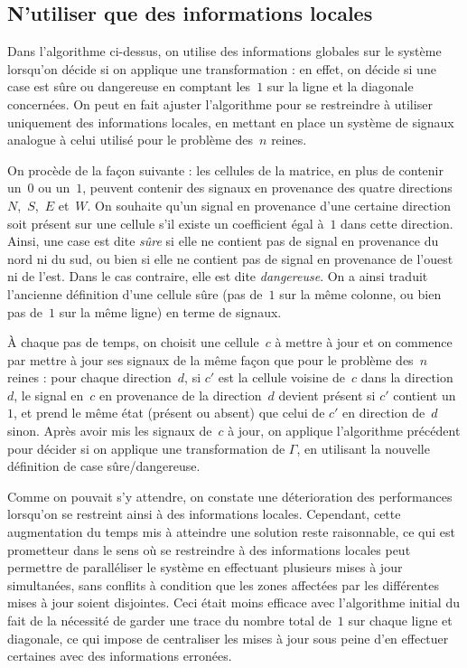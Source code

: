 \documentclass[11pt, openany, a4paper]{article}
\begin{document}
\subsection{N'utiliser que des informations locales}

Dans l'algorithme ci-dessus, on utilise des informations globales sur le système lorsqu'on décide si on applique une transformation : en effet, on décide si une case est sûre ou dangereuse en comptant les~$1$ sur la ligne et la diagonale concernées. On peut en fait ajuster l'algorithme pour se restreindre à utiliser uniquement des informations locales, en mettant en place un système de signaux analogue à celui utilisé pour le problème des~$n$ reines. 

On procède de la façon suivante : les cellules de la matrice, en plus de contenir un~$0$ ou un~$1$, peuvent contenir des signaux en provenance des quatre directions~$N$,~$S$,~$E$ et~$W$. On souhaite qu'un signal en provenance d'une certaine direction soit présent sur une cellule s'il existe un coefficient égal à~$1$ dans cette direction. Ainsi, une case est dite \emph{sûre} si elle ne contient pas de signal en provenance du nord ni du sud, ou bien si elle ne contient pas de signal en provenance de l'ouest ni de l'est. Dans le cas contraire, elle est dite \emph{dangereuse}. On a ainsi traduit l'ancienne définition d'une cellule sûre (pas de~$1$ sur la même colonne, ou bien pas de~$1$ sur la même ligne) en terme de signaux.

À chaque pas de temps, on choisit une cellule~$c$ à mettre à jour et on commence par mettre à jour ses signaux de la même façon que pour le problème des~$n$ reines : pour chaque direction~$d$, si $c'$ est la cellule voisine de~$c$ dans la direction~$d$, le signal en~$c$ en provenance de la direction~$d$ devient présent si $c'$ contient un~$1$, et prend le même état (présent ou absent) que celui de $c'$ en direction de~$d$ sinon.
Après avoir mis les signaux de~$c$ à jour, on applique l'algorithme précédent pour décider si on applique une transformation de $\Gamma$, en utilisant la nouvelle définition de case sûre/dangereuse. 

Comme on pouvait s'y attendre, on constate une déterioration des performances lorsqu'on se restreint ainsi à des informations locales. Cependant, cette augmentation du temps mis à atteindre une solution reste raisonnable, ce qui est prometteur dans le sens où se restreindre à des informations locales peut permettre de paralléliser le système en effectuant plusieurs mises à jour simultanées, sans conflits à condition que les zones affectées par les différentes mises à jour soient disjointes. Ceci était moins efficace avec l'algorithme initial du fait de la nécessité de garder une trace du nombre total de~$1$ sur chaque ligne et diagonale, ce qui impose de centraliser les mises à jour sous peine d'en effectuer certaines avec des informations erronées.


\nocite{Pom96}
\nocite{BahiC06}
\nocite{Fat13}



\end{document}
